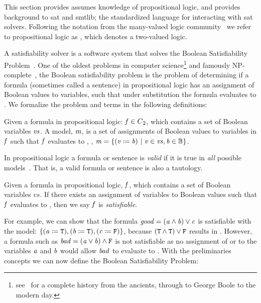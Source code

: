 \label{section:sat-solving}
%
This section provides assumes knowledge of propositional logic, and provides
background to \acl{sat} and \ac{smtlib}; the standardized language for
interacting with \ac{sat} solvers. Following the notation from the many-valued
logic community~\cite{Rescher1969-RESML} we refer to propositional logic as
\pl{}, which denotes a two-valued logic.

A satisfiability solver is a software system that solves the Boolean
Satisfiability Problem~\cite{russelNorvig}. One of the oldest problems in
computer science\footnote{see~\citet{BBH+09} for a complete history from the
  ancients, through to George Boole to the modern day.} and famously
NP-complete~\cite{10.1145/800157.805047}, the Boolean satisfiability problem is
the problem of determining if a formula (sometimes called a sentence) in
propositional logic has an assignment of Boolean values to variables, such that
under substitution the formula evaluates to \tru{}. We formalize the problem and
terms in the following definitions:

\begin{definition}[Model]
  Given a formula in propositional logic: $\mathit{f} \in {C\textsubscript{2}}{}$, which contains a
  set of Boolean variables $\mathit{vs}$. A model, $\mathit{m}$, is a set of assignments
  of Boolean values to variables in $\mathit{f}$ such that $\mathit{f}$ evaluates to
  \tru{}, \ie{}, $\mathit{m = \{ (v \coloneqq{} b)\ |\ v \in vs, b \in \mathbb{B}} \}$.
\end{definition}

\begin{corollary}[Validity]
  In propositional logic a formula or
  sentence is \emph{valid} if it is true in \emph{all} possible
  models~\cite{russelNorvig}. That is, a valid formula or sentence is also a
  tautology.
\end{corollary}

\begin{definition}[Satisfiable]
  Given a formula in propositional logic, $\mathit{f}$, which contains a set of
  Boolean variables $vs$. If there exists an assignment of variables to Boolean
  values such that $\mathit{f}$ evaluates to \tru{}, then we say $\mathit{f}$ is
  \emph{satisfiable}.
\end{definition}

For example, we can show that the formula $\mathit{good = (a \wedge b) \vee c}$ is
satisfiable with the model: $\{\mathit{(a \coloneqq{}{} \texttt{T}{}), (b \coloneqq{}{} \texttt{T}{}),
  (c \coloneqq{}{} \texttt{F}{})}\}$, because $(\texttt{T}{} \wedge{} \texttt{T}{}) \vee{} \texttt{F}{}$
results in \tru{}. However, a formula such as $\mathit{bad = (a \vee b) \wedge
  \texttt{F}{}}$ is not satisfiable as no assignment of \fls{} or \tru{} to the
variables $\mathit{a}$ and $\mathit{b}$ would allow $\mathit{bad}$ to evaluate to \tru{}.
With the preliminaries concepts we can now define the Boolean Satisfiability
Problem:

